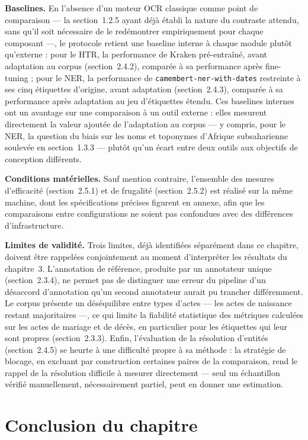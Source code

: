 \textbf{Baselines.} En l'absence d'un moteur OCR classique comme point de comparaison --- la section~1.2.5 ayant déjà établi la nature du contraste attendu, sans qu'il soit nécessaire de le redémontrer empiriquement pour chaque composant ---, le protocole retient une baseline interne à chaque module plutôt qu'externe : pour le HTR, la performance de Kraken pré-entraîné, avant adaptation au corpus (section~2.4.2), comparée à sa performance après fine-tuning ; pour le NER, la performance de \texttt{camembert-ner-with-dates} restreinte à ses cinq étiquettes d'origine, avant adaptation (section~2.4.3), comparée à sa performance après adaptation au jeu d'étiquettes étendu.
Ces baselines internes ont un avantage sur une comparaison à un outil externe : elles mesurent directement la valeur ajoutée de l'adaptation au corpus --- y compris, pour le NER, la question du biais sur les noms et toponymes d'Afrique subsaharienne soulevée en section~1.3.3 --- plutôt qu'un écart entre deux outils aux objectifs de conception différents.

\textbf{Conditions matérielles.} Sauf mention contraire, l'ensemble des mesures d'efficacité (section~2.5.1) et de frugalité (section~2.5.2) est réalisé sur la même machine, dont les spécifications précises figurent en annexe, afin que les comparaisons entre configurations ne soient pas confondues avec des différences d'infrastructure.

\textbf{Limites de validité.} Trois limites, déjà identifiées séparément dans ce chapitre, doivent être rappelées conjointement au moment d'interpréter les résultats du chapitre~3.
L'annotation de référence, produite par un annotateur unique (section~2.3.4), ne permet pas de distinguer une erreur du pipeline d'un désaccord d'annotation qu'un second annotateur aurait pu trancher différemment.
Le corpus présente un déséquilibre entre types d'actes --- les actes de naissance restant majoritaires ---, ce qui limite la fiabilité statistique des métriques calculées sur les actes de mariage et de décès, en particulier pour les étiquettes qui leur sont propres (section~2.3.3).
Enfin, l'évaluation de la résolution d'entités (section~2.4.5) se heurte à une difficulté propre à sa méthode : la stratégie de blocage, en excluant par construction certaines paires de la comparaison, rend le rappel de la résolution difficile à mesurer directement --- seul un échantillon vérifié manuellement, nécessairement partiel, peut en donner une estimation.

\section*{Conclusion du chapitre}


